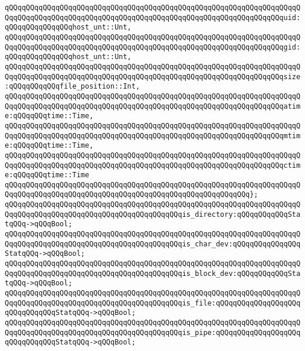 \verb|qQQqqQQqqQQqqQQqqQQqqQQqqQQqqQQqqQQqqQQqqQQqqQQqqQQqqQQqqQQqqQQqqQQqqQQqqQQqqQQqqQQqqQQqqQQqqQQqqQQqqQQqqQQqqQQqqQQqqQQqqQQqqQQqqQQqqQQquid:qQQqqQQqqQQqqQQqhost_unt::Unt,|\newline
\verb|qQQqqQQqqQQqqQQqqQQqqQQqqQQqqQQqqQQqqQQqqQQqqQQqqQQqqQQqqQQqqQQqqQQqqQQqqQQqqQQqqQQqqQQqqQQqqQQqqQQqqQQqqQQqqQQqqQQqqQQqqQQqqQQqqQQqqQQqgid:qQQqqQQqqQQqqQQqhost_unt::Unt,|\newline
\verb|qQQqqQQqqQQqqQQqqQQqqQQqqQQqqQQqqQQqqQQqqQQqqQQqqQQqqQQqqQQqqQQqqQQqqQQqqQQqqQQqqQQqqQQqqQQqqQQqqQQqqQQqqQQqqQQqqQQqqQQqqQQqqQQqqQQqqQQqsize:qQQqqQQqqQQqfile_position::Int,|\newline
\verb|qQQqqQQqqQQqqQQqqQQqqQQqqQQqqQQqqQQqqQQqqQQqqQQqqQQqqQQqqQQqqQQqqQQqqQQqqQQqqQQqqQQqqQQqqQQqqQQqqQQqqQQqqQQqqQQqqQQqqQQqqQQqqQQqqQQqqQQqatime:qQQqqQQqtime::Time,|\newline
\verb|qQQqqQQqqQQqqQQqqQQqqQQqqQQqqQQqqQQqqQQqqQQqqQQqqQQqqQQqqQQqqQQqqQQqqQQqqQQqqQQqqQQqqQQqqQQqqQQqqQQqqQQqqQQqqQQqqQQqqQQqqQQqqQQqqQQqqQQqmtime:qQQqqQQqtime::Time,|\newline
\verb|qQQqqQQqqQQqqQQqqQQqqQQqqQQqqQQqqQQqqQQqqQQqqQQqqQQqqQQqqQQqqQQqqQQqqQQqqQQqqQQqqQQqqQQqqQQqqQQqqQQqqQQqqQQqqQQqqQQqqQQqqQQqqQQqqQQqqQQqctime:qQQqqQQqtime::Time|\newline
\verb|qQQqqQQqqQQqqQQqqQQqqQQqqQQqqQQqqQQqqQQqqQQqqQQqqQQqqQQqqQQqqQQqqQQqqQQqqQQqqQQqqQQqqQQqqQQqqQQqqQQqqQQqqQQqqQQqqQQqqQQqqQQqqQQq};|\newline
\newline
\verb|qQQqqQQqqQQqqQQqqQQqqQQqqQQqqQQqqQQqqQQqqQQqqQQqqQQqqQQqqQQqqQQqqQQqqQQqqQQqqQQqqQQqqQQqqQQqqQQqqQQqqQQqqQQqqQQqis_directory:qQQqqQQqqQQqStatqQQq->qQQqBool;|\newline
\verb|qQQqqQQqqQQqqQQqqQQqqQQqqQQqqQQqqQQqqQQqqQQqqQQqqQQqqQQqqQQqqQQqqQQqqQQqqQQqqQQqqQQqqQQqqQQqqQQqqQQqqQQqqQQqqQQqis_char_dev:qQQqqQQqqQQqqQQqStatqQQq->qQQqBool;|\newline
\verb|qQQqqQQqqQQqqQQqqQQqqQQqqQQqqQQqqQQqqQQqqQQqqQQqqQQqqQQqqQQqqQQqqQQqqQQqqQQqqQQqqQQqqQQqqQQqqQQqqQQqqQQqqQQqqQQqis_block_dev:qQQqqQQqqQQqStatqQQq->qQQqBool;|\newline
\verb|qQQqqQQqqQQqqQQqqQQqqQQqqQQqqQQqqQQqqQQqqQQqqQQqqQQqqQQqqQQqqQQqqQQqqQQqqQQqqQQqqQQqqQQqqQQqqQQqqQQqqQQqqQQqqQQqis_file:qQQqqQQqqQQqqQQqqQQqqQQqqQQqqQQqStatqQQq->qQQqBool;|\newline
\verb|qQQqqQQqqQQqqQQqqQQqqQQqqQQqqQQqqQQqqQQqqQQqqQQqqQQqqQQqqQQqqQQqqQQqqQQqqQQqqQQqqQQqqQQqqQQqqQQqqQQqqQQqqQQqqQQqis_pipe:qQQqqQQqqQQqqQQqqQQqqQQqqQQqqQQqStatqQQq->qQQqBool;|\newline
